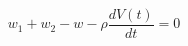 \begin{equation}
  w_1 + w_2 - w - \rho \frac{dV(t)}{dt} = 0
  \label{eq:massbalance01_2}
\end{equation}